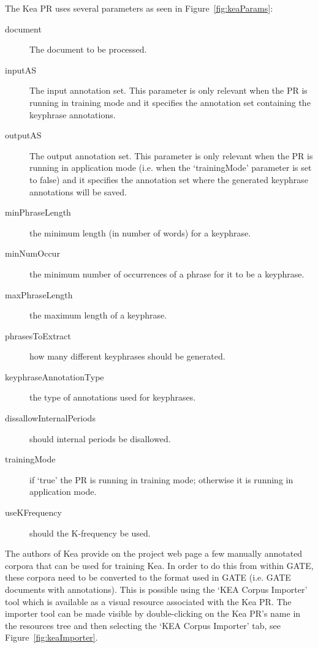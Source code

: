 The Kea PR uses several parameters as seen in Figure~\ref{fig:keaParams}:
\begin{description}
\item[document] The document to be processed.
\item[inputAS] The input annotation set. This parameter is only relevant when
the PR is running in training mode and it specifies the annotation set containing
the keyphrase annotations.
\item[outputAS] The output annotation set. This parameter is only relevant when
the PR is running in application mode (i.e. when the `trainingMode' parameter is
set to false) and it specifies the annotation set where the generated keyphrase
annotations will be saved.
\item[minPhraseLength] the minimum length (in number of words) for a keyphrase.
\item[minNumOccur] the minimum number of occurrences of a phrase for it to be a
keyphrase.
\item[maxPhraseLength] the maximum length of a keyphrase.
\item[phrasesToExtract] how many different keyphrases should be generated.
\item[keyphraseAnnotationType] the type of annotations used for keyphrases.
\item[dissallowInternalPeriods] should internal periods be disallowed.
\item[trainingMode] if `true' the PR is running in training mode; otherwise it
is running in application mode.
\item[useKFrequency] should the K-frequency be used.
\end{description}



The authors of Kea provide on the project web page a few manually annotated
corpora that can be used for training Kea. In order to do this from within GATE,
these corpora need to be converted to the format used in GATE (i.e. GATE
documents with annotations). This is possible using the `KEA Corpus Importer'
tool which is available as a visual resource associated with the Kea PR. The
importer tool can be made visible by double-clicking on the Kea PR's name in the
resources tree and then selecting the `KEA Corpus Importer' tab, see
Figure~\ref{fig:keaImporter}.

